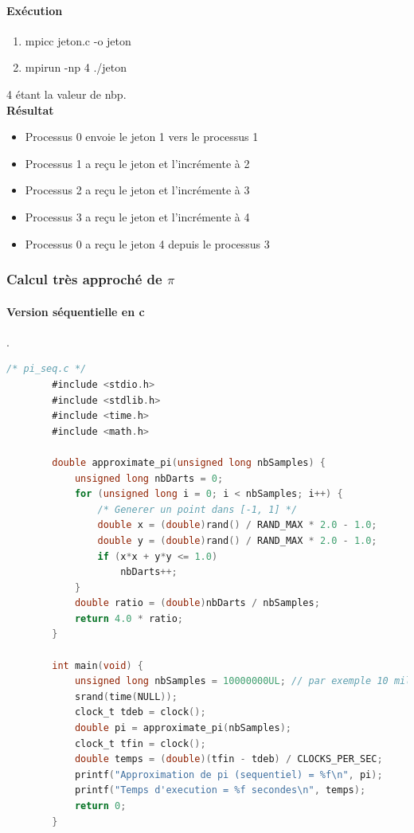 \documentclass[a4paper,13pt]{book}
\begin{document}
\paragraph{Exécution}
\begin{enumerate}
    \item mpicc jeton.c -o jeton
    \item mpirun -np 4 ./jeton
\end{enumerate}
4 étant la valeur de nbp.\\
\textbf{Résultat}
\begin{itemize}
\item Processus 0 envoie le jeton 1 vers le processus 1
\item Processus 1 a reçu le jeton et l'incrémente à 2
\item Processus 2 a reçu le jeton et l'incrémente à 3
\item Processus 3 a reçu le jeton et l'incrémente à 4
\item Processus 0 a reçu le jeton 4 depuis le processus 3
\end{itemize}
\subsubsection{Calcul très approché de $\pi$}
\paragraph{Version séquentielle en c}.\\

	\begin{lstlisting}[language=C]
        /* pi_seq.c */
        #include <stdio.h>
        #include <stdlib.h>
        #include <time.h>
        #include <math.h>
        
        double approximate_pi(unsigned long nbSamples) {
            unsigned long nbDarts = 0;
            for (unsigned long i = 0; i < nbSamples; i++) {
                /* Generer un point dans [-1, 1] */
                double x = (double)rand() / RAND_MAX * 2.0 - 1.0;
                double y = (double)rand() / RAND_MAX * 2.0 - 1.0;
                if (x*x + y*y <= 1.0)
                    nbDarts++;
            }
            double ratio = (double)nbDarts / nbSamples;
            return 4.0 * ratio;
        }
        
        int main(void) {
            unsigned long nbSamples = 10000000UL; // par exemple 10 millions de points
            srand(time(NULL));
            clock_t tdeb = clock();
            double pi = approximate_pi(nbSamples);
            clock_t tfin = clock();
            double temps = (double)(tfin - tdeb) / CLOCKS_PER_SEC;
            printf("Approximation de pi (sequentiel) = %f\n", pi);
            printf("Temps d'execution = %f secondes\n", temps);
            return 0;
        }
        
        
\end{lstlisting}
\end{document}
